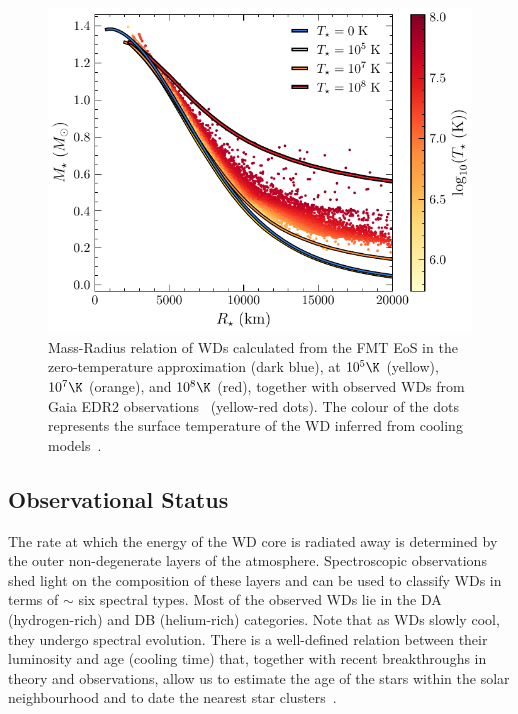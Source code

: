 \begin{figure}[t!bp]
    \centering
    \includegraphics{WD_mass_radius.pdf}
    \caption{Mass-Radius relation of WDs calculated from the FMT EoS in the zero-temperature approximation (dark blue), at $10^{5}\K$ (yellow), $10^{7}\K$ (orange), and $10^{8}\K$ (red), together with observed WDs from Gaia EDR2 observations~\cite{GentileFusillo_feb_GaiaDataRelease} (yellow-red dots). The colour of the dots represents the surface temperature of the WD inferred from cooling models~\cite{Bedard_oct_Spectralevolutionhot}.}
    \label{ch2:fig:WD_mass_radius}
\end{figure}


\subsection{Observational Status}
\label{ch2:subsec:WD_obs}

The rate at which the energy of the WD core is radiated away is determined by the outer non-degenerate layers of the atmosphere. 
Spectroscopic observations shed light on the composition of these layers and can be used to classify WDs in terms of $\sim$ six spectral types. 
Most of the observed WDs lie in the DA (hydrogen-rich) and DB (helium-rich) categories.  Note that as WDs slowly cool, they undergo spectral evolution. There is a well-defined relation between their luminosity and age (cooling time) that, together with recent breakthroughs in theory and observations, allow us to estimate the age of the stars within the solar neighbourhood and to date the nearest star clusters~\cite{Hansen:2004ih_HSTobservationswhite,Hansen:2007ve_Whitedwarfcooling,Bedin:2009it_jun_Endwhitedwarf,Hansen:2013gda_aug_Agedifferencetwo,Kilic_mar_Agesthindisk}. 

